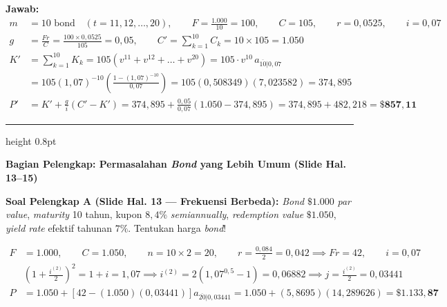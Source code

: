 \documentclass[10.5pt,a4paper]{article}
\begin{document}
\textbf{Jawab:}
\begin{align*}
    m &= 10 \text{ bond} \quad (t = 11, 12, \dots, 20), \qquad F = \frac{1.000}{10} = 100, \qquad C = 105, \qquad r = 0{,}0525, \qquad i = 0{,}07 \\[0.3em]
    g &= \frac{Fr}{C} = \frac{100 \times 0{,}0525}{105} = 0{,}05, \qquad C' = \sum_{k=1}^{10} C_k = 10 \times 105 = 1.050 \\[0.3em]
    K' &= \sum_{k=1}^{10} K_k = 105\left(v^{11} + v^{12} + \dots + v^{20}\right) = 105 \cdot v^{10} \, a_{\overline{10}|0{,}07} \\
       &= 105(1{,}07)^{-10}\left(\frac{1 - (1{,}07)^{-10}}{0{,}07}\right) = 105(0{,}508349)(7{,}023582) = 374{,}895 \\[0.3em]
    P' &= K' + \frac{g}{i}\left(C' - K'\right) = 374{,}895 + \frac{0{,}05}{0{,}07}\left(1.050 - 374{,}895\right) = 374{,}895 + 482{,}218 = \mathbf{\$857{,}11}
\end{align*}

\vspace{0.5em}
\hrule height 0.8pt
\vspace{0.5em}
\begin{center}
    {\textbf{Bagian Pelengkap: Permasalahan \textit{Bond} yang Lebih Umum (Slide Hal. 13--15)}}
\end{center}

\begin{tcolorbox}
\textbf{Soal Pelengkap A (Slide Hal. 13 --- Frekuensi Berbeda):} \textit{Bond} $\$1.000$ \textit{par value}, \textit{maturity} 10 tahun, kupon $8{,}4\%$ \textit{semiannually}, \textit{redemption value} $\$1.050$, \textit{yield rate} efektif tahunan $7\%$. Tentukan harga \textit{bond}!
\end{tcolorbox}
\begin{align*}
    F &= 1.000, \qquad C = 1.050, \qquad n = 10 \times 2 = 20, \qquad r = \frac{0{,}084}{2} = 0{,}042 \implies Fr = 42, \qquad i = 0{,}07 \\[0.2em]
    &\left(1 + \frac{i^{(2)}}{2}\right)^2 = 1 + i = 1{,}07 \implies i^{(2)} = 2\left(1{,}07^{0{,}5} - 1\right) = 0{,}06882 \implies j = \frac{i^{(2)}}{2} = 0{,}03441 \\[0.2em]
    P &= 1.050 + \left[42 - (1.050)(0{,}03441)\right] a_{\overline{20}|0{,}03441} = 1.050 + (5{,}8695)(14{,}289626) = \mathbf{\$1.133{,}87}
\end{align*}
\end{document}
